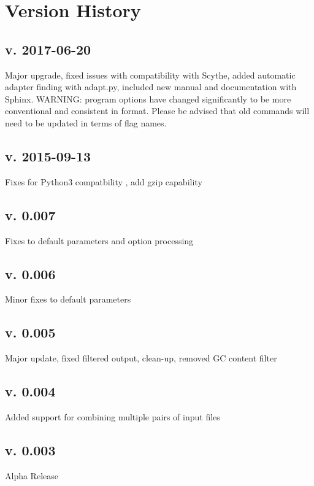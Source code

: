 \documentclass[letterpaper,11pt,english]{sphinxmanual}
\begin{document}
\section{Version History}
\label{\detokenize{intro:version-history}}

\subsection{v. 2017-06-20}
\label{\detokenize{intro:v-2017-06-20}}
Major upgrade, fixed issues with compatibility with Scythe,
added automatic adapter finding with adapt.py,
included new manual and documentation with Sphinx.
WARNING: program options have changed significantly to
be more conventional and consistent in format. Please be
advised that old commands will need to be updated in terms
of flag names.


\subsection{v. 2015-09-13}
\label{\detokenize{intro:v-2015-09-13}}
Fixes for Python3 compatbility , add gzip capability


\subsection{v. 0.007}
\label{\detokenize{intro:v-0-007}}
Fixes to default parameters and option processing


\subsection{v. 0.006}
\label{\detokenize{intro:v-0-006}}
Minor fixes to default parameters


\subsection{v. 0.005}
\label{\detokenize{intro:v-0-005}}
Major update, fixed filtered output, clean-up, removed GC content filter


\subsection{v. 0.004}
\label{\detokenize{intro:v-0-004}}
Added support for combining multiple pairs of input files


\subsection{v. 0.003}
\label{\detokenize{intro:v-0-003}}
Alpha Release
\end{document}
